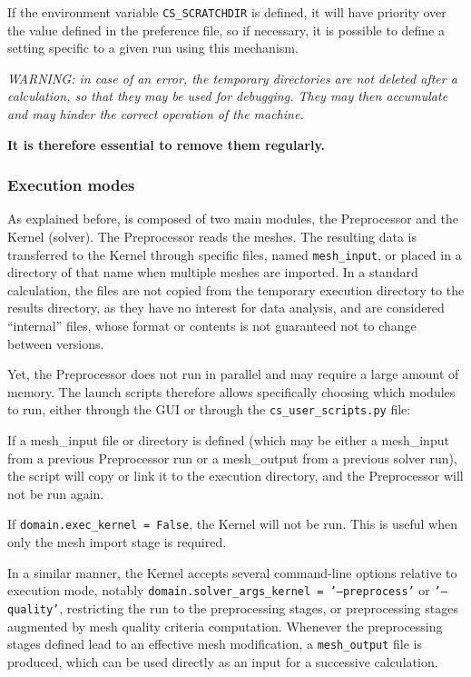 {{{If the environment variable \texttt{CS\_SCRATCHDIR} is defined, it will have
priority over the value defined in the preference file, so if necessary, it
is possible to define a setting specific to a given run using this mechanism.

\noindent
{\em WARNING: in case of an error, the temporary directories are not deleted
after a calculation, so that they may be used for debugging. They may then
accumulate and may hinder the correct operation of the machine.\\
\centerline{\bf It is therefore essential to remove them regularly.}}


\subsubsection{Execution modes}
\label{sec:prg_executionmodes}%
As explained before, \CS is composed of two main modules, the Preprocessor and the
Kernel (solver). The Preprocessor reads the meshes.
The resulting data is transferred to the Kernel through specific
files, named \texttt{mesh\_input}, or placed in a directory of that name when multiple meshes are imported. In a standard calculation, the files
are not copied from the temporary execution directory to the results directory,
as they have no interest for data analysis, and are considered ``internal''
files, whose format or contents is not guaranteed not to change between \CS versions.

Yet, the Preprocessor does not run in parallel and may require a
large amount of memory. The launch scripts therefore allows specifically
choosing which modules to run, either through the GUI or through the
\texttt{cs\_user\_scripts.py} file:

\hspace*{0.5cm} If a {mesh\_input} file or directory is defined (which may be
either a {mesh\_input} from a previous Preprocessor run or a {mesh\_output}
from a previous solver run), the script will copy or link it to
the execution directory, and the Preprocessor will not be run again.

\hspace*{0.5cm} If \texttt{domain.exec\_kernel = False}, the Kernel will not
be run. This is useful when only the mesh import stage is required.

In a similar manner, the Kernel accepts several command-line options relative to execution mode, notably \texttt{domain.solver\_args\_kernel = '--preprocess'} or \texttt{'--quality'}, restricting the run to the preprocessing stages, or preprocessing stages augmented by mesh quality criteria computation. Whenever the preprocessing stages defined lead to an effective mesh modification, a \texttt{mesh\_output} file is produced, which can be used directly as an input for a successive calculation.

}}}
